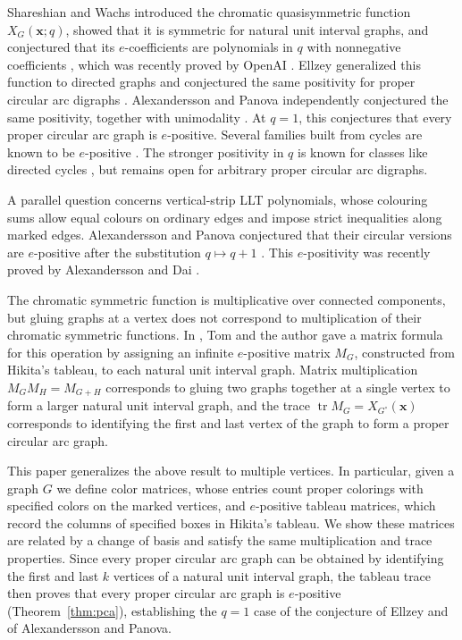 \documentclass[12pt]{article}
\theoremstyle{plain}
\theoremstyle{definition}
\theoremstyle{remark}
\begin{document}
Shareshian and Wachs introduced the chromatic quasisymmetric function
$X_G(\bm x;q)$, showed that it is symmetric for natural unit interval
graphs, and conjectured that its $e$-coefficients are polynomials in $q$
with nonnegative coefficients \cite{chromposquasi}, which was recently proved by OpenAI \cite[Theorem 1.1]{openaichrom}. Ellzey generalized
this function to directed graphs and conjectured the same positivity for
proper circular arc digraphs \cite[Conjecture 1.4]{chromquasidi}.
Alexandersson and Panova independently conjectured the same positivity,
together with unimodality \cite[Conjecture 5.2]{lltcycles}.
At $q=1$, this conjectures that every proper circular arc graph is $e$-positive.
Several families built from cycles are known to be $e$-positive
\cite{graphtwin,cyclechains,cyclechordsepositive}. The stronger positivity in $q$ is known for classes like directed cycles
\cite{lltcycles}, but remains open for arbitrary proper circular arc digraphs.

A parallel question concerns vertical-strip LLT polynomials, whose
colouring sums allow equal colours on ordinary edges and impose strict
inequalities along marked edges. Alexandersson and Panova conjectured
that their circular versions are $e$-positive after the substitution
$q\mapsto q+1$ \cite[Conjecture 4.5]{lltcycles}. This $e$-positivity was
recently proved by Alexandersson and Dai \cite[Theorem~B]{lltflip}.

The chromatic symmetric function is multiplicative over connected
components, but gluing graphs at a vertex does not correspond to
multiplication of their chromatic symmetric functions. In
\cite{singlegluing}, Tom and the author gave a matrix formula for this
operation by assigning an infinite $e$-positive matrix $M_G$, constructed from Hikita's tableau, to each natural unit interval graph. Matrix multiplication $M_GM_H=M_{G+H}$ corresponds to gluing two graphs together at a single vertex to form a larger natural unit interval graph, and the trace $\operatorname{tr} M_G=X_{G^\circ}(\bm x)$ corresponds to identifying the first and last vertex of the graph to form a proper circular arc graph.

This paper generalizes the above result to multiple vertices. In particular, given a graph $G$ we define color
matrices, whose entries count proper colorings with specified colors on
the marked vertices, and $e$-positive tableau matrices, which record the columns of
specified boxes in Hikita's tableau. We show these matrices are related by a change of basis and satisfy the same multiplication and trace properties. Since every proper circular arc graph can be obtained by identifying the first and last $k$ vertices of a natural unit interval graph, the tableau
trace then proves that every proper circular arc graph is $e$-positive
(Theorem~\ref{thm:pca}), establishing the $q=1$ case of the
conjecture of Ellzey and of Alexandersson and Panova.
\end{document}
